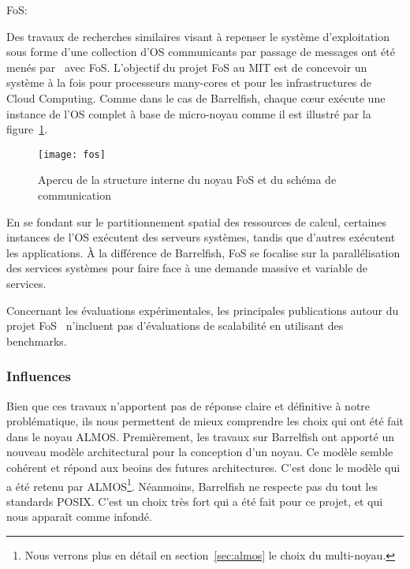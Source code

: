       \begin{paragraph}{FoS:}

        Des travaux de recherches similaires visant à repenser le système
        d’exploitation sous forme d’une collection d’OS communicants par passage
        de messages ont été menés par~\citet{wentzlaff2009factored} avec
        FoS. L’objectif du projet FoS au MIT est de concevoir un système à la
        fois pour processeurs many-cores et pour les infrastructures de Cloud
        Computing. Comme dans le cas de Barrelfish, chaque c\oe ur exécute une
        instance de l’OS complet à base de micro-noyau comme il est illustré par
        la figure~\ref{fig:fos}.

        \begin{figure}[h]
          \centering
          \texttt{[image: fos]}
          \caption{Apercu de la structure interne du noyau FoS et du schéma de
            communication}
          \label{fig:fos}
        \end{figure}

        En se fondant sur le partitionnement spatial des ressources de calcul,
        certaines instances de l’OS exécutent des serveurs systèmes, tandis que
        d’autres exécutent les applications. À la différence de Barrelfish, FoS
        se focalise sur la parallélisation des services systèmes pour faire face
        à une demande massive et variable de services.

        Concernant les évaluations expérimentales, les principales publications
        autour du projet FoS~\citep{wentzlaff2009factored,
          wentzlaff2010operating} n’incluent pas d'évaluations de scalabilité en
        utilisant des benchmarks.

      \end{paragraph}
      
    \subsubsection{Influences}

      Bien que ces travaux n'apportent pas de réponse claire et définitive à
      notre problématique, ils nous permettent de mieux comprendre les choix qui
      ont été fait dans le noyau ALMOS. Premièrement, les travaux sur Barrelfish
      ont apporté un nouveau modèle architectural pour la conception d'un
      noyau. Ce modèle semble cohérent et répond aux beoins des futures
      architectures. C'est donc le modèle qui a été retenu par
      ALMOS\footnote{Nous verrons plus en détail en section~\ref{sec:almos} le
        choix du multi-noyau.}. Néanmoins, Barrelfish ne respecte pas du tout
      les standards POSIX. C'est un choix très fort qui a été fait pour ce
      projet, et qui nous apparaît comme infondé.

